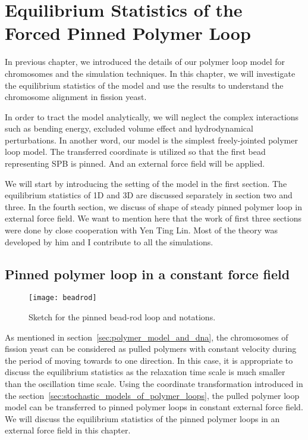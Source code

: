 \chapter{Equilibrium Statistics of the Forced Pinned Polymer Loop}
\graphicspath{{Chapter3/Figs/}}

In previous chapter, we introduced the details of our polymer loop model for chromosomes and the simulation techniques. In this chapter, we will investigate the equilibrium statistics of the model and use the results to understand the chromosome alignment in fission yeast. 

In order to tract the model analytically, we will neglect the complex interactions such as bending energy, excluded volume effect and hydrodynamical perturbations. In another word, our model is the simplest freely-jointed polymer loop model. The transferred coordinate is utilized so that the first bead representing SPB is pinned. And an external force field will be applied. 

We will start by introducing the setting of the model in the first section. The equilibrium statistics of 1D and 3D are discussed separately in section two and three. In the fourth section, we discuss of shape of steady pinned polymer loop in external force field. We want to mention here that the work of first three sections were done by close cooperation with Yen Ting Lin. Most of the theory was developed by him and I contribute to all the simulations. 


\section{Pinned polymer loop in a constant force field}
\label{sec:pinned_polymer_loop}
\begin{figure}[htpb]
    \centering
    \texttt{[image: beadrod]}
    \caption{Sketch for the pinned bead-rod loop and notations. }
    \label{fig:beadrod}
\end{figure}

As mentioned in section~\ref{sec:polymer_model_and_dna}, the chromosomes of fission yeast can be considered as pulled polymers with constant velocity during the period of moving towards to one direction. In this case, it is appropriate to discuss the equilibrium statistics as the relaxation time scale is much smaller than the oscillation time scale. Using the coordinate transformation introduced in the section~\ref{sec:stochastic_models_of_polymer_loops}, the pulled polymer loop model can be transferred to pinned polymer loops in constant external force field. We will discuss the equilibrium statistics of the pinned polymer loops in an external force field in this chapter.

